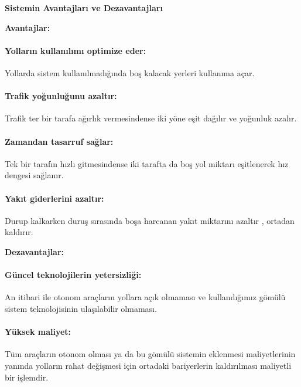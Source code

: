\documentclass[12pt,a4paper]{report}
\begin{document}
{\large\bfseries Sistemin Avantajları ve Dezavantajları\\ \par}

{\normalsize\bfseries Avantajlar: \par}

\paragraph{Yolların kullanılımı optimize eder:} Yollarda sistem kullanılmadığında boş kalacak yerleri kullanıma açar. \\

\paragraph{Trafik yoğunluğunu azaltır:} Trafik ter bir tarafa ağırlık vermesindense iki yöne eşit dağılır ve yoğunluk azalır. \\

\paragraph{Zamandan tasarruf sağlar:} Tek bir tarafın hızlı gitmesindense iki tarafta da boş yol miktarı eşitlenerek hız dengesi sağlanır. \\

\paragraph{Yakıt giderlerini azaltır:} Durup kalkarken duruş sırasında boşa harcanan yakıt miktarını azaltır , ortadan kaldırır. \\

{\normalsize\bfseries Dezavantajlar: \par}

\paragraph{Güncel teknolojilerin yetersizliği:} An itibari ile otonom araçların yollara açık olmaması ve kullandığımız gömülü sistem teknolojisinin ulaşılabilir olmaması. \\

\paragraph{Yüksek maliyet:} Tüm araçların otonom olması ya da bu gömülü sistemin eklenmesi maliyetlerinin yanında yolların rahat değişmesi için ortadaki bariyerlerin kaldırılması maliyetli bir işlemdir.
\end{document}
